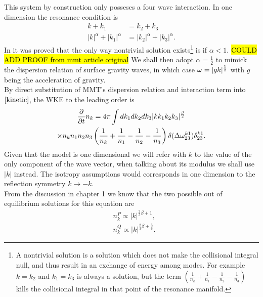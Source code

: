     This system by construction only posseses a four wave interaction. In one dimension the resonance condition is
    \begin{equation}
        \begin{aligned}
            k + k_1 &= k_2 + k_3 \\
            |k|^\alpha + |k_1|^\alpha &= |k_2|^\alpha + |k_3|^\alpha.
        \end{aligned}
    \end{equation}
    In \cite{Majda1997} it was proved that the only way nontrivial solution exists\footnote{
        A nontrivial solution is a solution which does not make the collisional integral null, and thus result in an exchange of energy among modes. 
        For example $k=k_2$ and $k_1=k_3$ is always a solution, but the term 
        $\left(\frac{1}{n_k} +\frac{1}{n_1} -\frac{1}{n_2}-\frac{1}{n_3} \right)$ kills the collisional integral in that point of the resonance manifold.
    } is if $\alpha < 1$. \hl{COULD ADD PROOF from mmt article original} We shall then adopt $\alpha = \frac{1}{2}$ to mimick the dispersion relation of surface gravity waves, in which case $\omega^{} = |gk|^\frac{1}{2}$ 
    with $g$ being the acceleration of gravity.\\
    By direct substitution of MMT's dispersion relation and interaction term into $\eqref{kinetic}$, the WKE to the leading order is 
    \begin{multline}
        \frac{\partial}{\partial t} n_k = 4 \pi\int dk_1 dk_2 dk_3 
        |kk_1k_2k_3|^\frac{\beta}{2}
        \\ \times n_kn_1n_2n_3
    \left(\frac{1}{n_k} + \frac{1}{n_1} - \frac{1}{n_2}- \frac{1}{n_3}  \right)
    \delta(\Delta{\omega}^{k1}_{23})\delta^{k1}_{23}.
    \end{multline}
    Given that the model is one dimensional we will refer with $k$ to the value of the only component of the wave vector, when talking about its modulus we shall use $|k|$ instead. The isotropy assumptions would corresponds in one dimension
    to the reflection symmetry $k \rightarrow -k$.\\ 
    From the discussion in chapter 1 we know that the two possible out of equilibrium solutions for this equation are 
    \begin{equation}
        \begin{aligned}
        &n_k^P \propto |k|^{\frac{2}{3}\beta + 1}, \\
        &n_k^Q \propto |k|^{\frac{2}{3}\beta + \frac{5}{6}}.
        \end{aligned}
        \label{MMTKZ}
    \end{equation}
